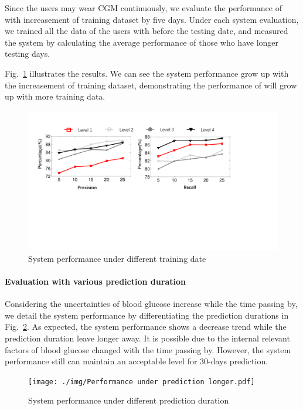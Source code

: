 Since the users may wear CGM continuously, we evaluate the performance of \sysname with increasement of training dataset by five days. Under each system evaluation, we trained all the data of the users with before the testing date, and measured the system by calculating the average performance of those who have longer testing days.

Fig.~\ref{fig:per_under_train_days} illustrates the results. We can see the system performance grow up with the increasement of training dataset, demonstrating the performance of \sysname will grow up with more training data.


\begin{figure}[!t]
\centering
\includegraphics[width=0.9\columnwidth]{./img/performance_under_days.pdf}
\caption{System performance under different training date}
\label{fig:per_under_train_days}
\end{figure}



\paragraph{Evaluation with various prediction duration}

Considering the uncertainties of blood glucose increase while the time passing by, we detail the system performance by differentiating the prediction durations in  Fig.~\ref{fig:per_under_various_pred_days}.
As expected, the system performance shows a decrease trend while the prediction duration leave longer away. It is possible due to the internal relevant factors of blood glucose changed with the time passing by. However, the system performance still can maintain an acceptable level for 30-days prediction.



\begin{figure}[!t]
\centering
\texttt{[image: ./img/Performance under prediction
longer.pdf]}
\caption{System performance under different prediction duration}
\label{fig:per_under_various_pred_days}
\end{figure}




